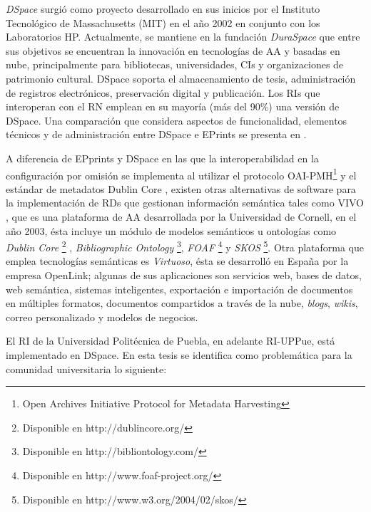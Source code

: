 \textit{DSpace} \cite{DSpaceRef} surgi\'o como proyecto desarrollado en sus inicios por el Instituto Tecnol\'ogico de Massachusetts (MIT) en el a\~{n}o 2002 en conjunto con los Laboratorios HP. Actualmente, se mantiene en la fundaci\'on \textit{DuraSpace} que entre sus objetivos se encuentran la innovaci\'on en tecnolog\'ias de AA y basadas en nube, principalmente para bibliotecas, universidades, CIs y organizaciones de patrimonio cultural. DSpace soporta el almacenamiento de tesis, administraci\'on de registros electr\'onicos, preservaci\'on digital y publicaci\'on. Los RIs que interoperan con el RN \cite{RepositorioNacional} emplean en su mayor\'ia (m\'as del 90\%) una versi\'on de DSpace.  Una comparaci\'on que considera aspectos de funcionalidad, elementos t\'ecnicos y de administraci\'on entre DSpace e EPrints se presenta en \cite{EvaluacionDeUsabilidad}.\newline

A diferencia de EPprints y DSpace en las que la interoperabilidad en la configuraci\'on por omisi\'on se implementa al utilizar el protocolo  OAI-PMH\footnote{Open Archives Initiative Protocol for Metadata Harvesting} \cite{Lagoze2005} y el est\'andar de metadatos Dublin Core \cite{DublinCore}, existen otras alternativas de software para la implementaci\'on de RDs que gestionan informaci\'on sem\'antica tales como VIVO \cite{VivoWeb}, que es una plataforma de AA desarrollada por la Universidad de Cornell, en el a\~{n}o 2003, \'esta incluye un m\'odulo de modelos sem\'anticos u ontolog\'ias como \textit{Dublin Core} \footnote{Disponible en http://dublincore.org/} , \textit{Bibliographic Ontology} \footnote{Disponible en http://bibliontology.com/}, \textit{FOAF} \footnote{Disponible en http://www.foaf-project.org/} y \textit{SKOS} \footnote{Disponible en http://www.w3.org/2004/02/skos/}. 
Otra plataforma que emplea tecnolog\'ias sem\'anticas es \emph{Virtuoso}, \'esta se desarroll\'o en Espa\~{n}a por la empresa OpenLink\cite{VirtuosoRef}; algunas de sus aplicaciones son servicios web, bases de datos, web sem\'antica, sistemas inteligentes, exportaci\'on e importaci\'on de documentos en m\'ultiples formatos, documentos compartidos a trav\'es de la nube, \emph{blogs}, \emph{wikis}, correo personalizado y modelos de negocios.\newline

El RI de la Universidad Polit\'ecnica de Puebla, en adelante RI-UPPue, est\'a implementado en DSpace. En esta tesis se identifica como problem\'atica para la comunidad universitaria lo siguiente:

